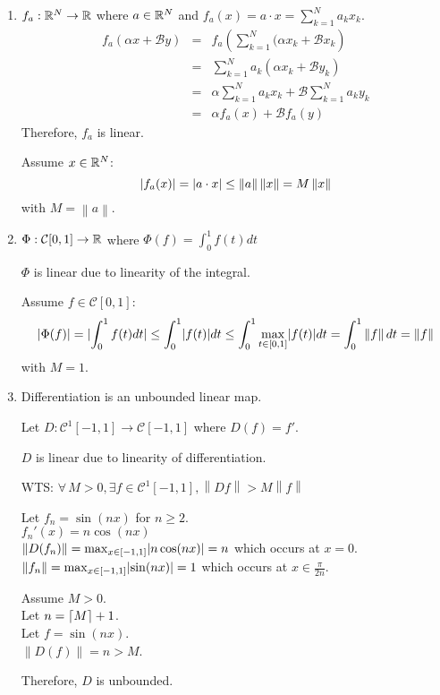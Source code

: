 \documentclass[letterpaper,12pt,fleqn]{article}
\newcommand{\norm}[1]{\left\|#1\right\|}
\renewcommand{\a}{\alpha}
\renewcommand{\b}{\beta}
\renewcommand{\P}{\Phi}
\renewcommand{\c}{\mathcal{C}}
\renewcommand{\b}{\mathcal{B}}
\DeclarePairedDelimiter{\ceil}{\lceil}{\rceil}
\begin{document}
\begin{examples}
  \listbreak
  \begin{enumerate}
  \item $f_a:\mathbb{R}^N\to\mathbb{R}$ where $a\in\mathbb{R}^N$ and
    $f_a(x)=a\cdot x=\sum_{k=1}^Na_kx_k$.
    \begin{eqnarray*}
      f_a(\a x+\b y) &=& f_a\left(\sum_{k=1}^N(\a x_k+\b x_k\right) \\
      &=& \sum_{k=1}^Na_k(\a x_k+\b y_k) \\
      &=& \a\sum_{k=1}^Na_k x_k+\b\sum_{k=1}^Na_k y_k \\
      &=& \a f_a(x)+\b f_a(y)
    \end{eqnarray*}
    Therefore, $f_a$ is linear.

    Assume $x\in\mathbb{R}^N$:
    \[\abs{f_a(x)}=\abs{a\cdot x}\le\norm{a}\norm{x}=M\norm{x}\]
    with $M=\norm{a}$.

  \item $\P:\c[0,1]\to\R$ where $\P(f)=\int_0^1f(t)dt$

    $\P$ is linear due to linearity of the integral.

    Assume $f\in\c[0,1]$:
    \[\abs{\P(f)}=\abs{\int_0^1f(t)dt}\le\int_0^1\abs{f(t)}dt\le
    \int_0^1\max_{t\in[0,1]}\abs{f(t)}dt=\int_0^1\norm{f}dt=\norm{f}\]
    with $M=1$.

  \item Differentiation is an unbounded linear map.

    Let $D:\c^1[-1,1]\to\c[-1,1]$ where $D(f)=f'$.

    $D$ is linear due to linearity of differentiation.

    WTS: $\forall\,M>0,\exists f\in\c^1[-1,1],\norm{Df}>M\norm{f}$

    Let $f_n=\sin(nx)$ for $n\ge2$. \\
    $f_n'(x)=n\cos(nx)$ \\
    $\norm{D(f_n)}=\max_{x\in[-1,1]}\abs{n\cos(nx)}=n$ which occurs at $x=0$. \\
    $\norm{f_n}=\max_{x\in[-1,1]}\abs{\sin(nx)}=1$ which occurs at
    $x\in\frac{\pi}{2n}$.

    Assume $M>0$. \\
    Let $n=\ceil{M}+1$. \\
    Let $f=\sin(nx)$. \\
    $\norm{D(f)}=n>M$.

    Therefore, $D$ is unbounded.
  \end{enumerate}
\end{examples}
\end{document}

